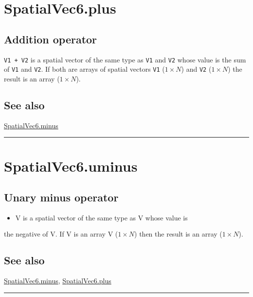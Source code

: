 \hypertarget{SpatialVec6.plus}{\section*{SpatialVec6.plus}}
\subsection*{Addition operator}


\texttt{V1 + V2} is a spatial vector of the same type as \texttt{V1} and \texttt{V2} whose value is
the sum of \texttt{V1} and \texttt{V2}.  If both are arrays of spatial vectors \texttt{V1} ($1 \times N$) and
\texttt{V2} ($1 \times N$) the result is an array ($1 \times N$).


\subsection*{See also}


\hyperlink{SpatialVec6.minus}{\color{blue} SpatialVec6.minus}

\vspace{1.5ex}\hrule

\hypertarget{SpatialVec6.uminus}{\section*{SpatialVec6.uminus}}
\subsection*{Unary minus operator}
\begin{itemize}
  \item V is a spatial vector of the same type as V whose value is
\end{itemize}


the negative of V.  If V is an array V ($1 \times N$) then the result
is an array ($1 \times N$).


\subsection*{See also}


\hyperlink{SpatialVec6.minus}{\color{blue} SpatialVec6.minus}, \hyperlink{SpatialVec6.plus}{\color{blue} SpatialVec6.plus}

\vspace{1.5ex}\rule{\textwidth}{1mm}

